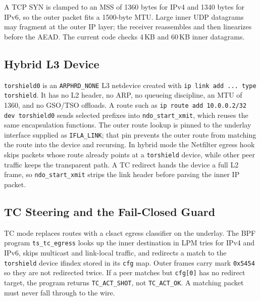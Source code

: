 \documentclass[conference]{IEEEtran}
\newcommand{\code}[1]{\texttt{#1}}
\begin{document}
A TCP SYN is clamped to an MSS of 1360 bytes for IPv4 and 1340 bytes for IPv6, so the outer packet fits a 1500-byte MTU. Large inner UDP datagrams may fragment at the outer IP layer; the receiver reassembles and then linearizes before the AEAD. The current code checks 4\,KB and 60\,KB inner datagrams.

\subsection{Hybrid L3 Device}
\code{torshield0} is an \code{ARPHRD\_NONE} L3 netdevice created with \code{ip link add ... type torshield}. It has no L2 header, no ARP, no queueing discipline, an MTU of 1360, and no GSO/TSO offloads. A route such as \code{ip route add 10.0.0.2/32 dev torshield0} sends selected prefixes into \code{ndo\_start\_xmit}, which reuses the same encapsulation functions. The outer route lookup is pinned to the underlay interface supplied as \code{IFLA\_LINK}; that pin prevents the outer route from matching the route into the device and recursing. In hybrid mode the Netfilter egress hook skips packets whose route already points at a \code{torshield} device, while other peer traffic keeps the transparent path. A TC redirect hands the device a full L2 frame, so \code{ndo\_start\_xmit} strips the link header before parsing the inner IP packet.

\subsection{TC Steering and the Fail-Closed Guard}
\label{sec:tc}
TC mode replaces routes with a clsact egress classifier on the underlay. The BPF program \code{ts\_tc\_egress} looks up the inner destination in LPM tries for IPv4 and IPv6, skips multicast and link-local traffic, and redirects a match to the \code{torshield} device ifindex stored in its \code{cfg} map. Outer frames carry mark \code{0x5454} so they are not redirected twice. If a peer matches but \code{cfg[0]} has no redirect target, the program returns \code{TC\_ACT\_SHOT}, not \code{TC\_ACT\_OK}. A matching packet must never fall through to the wire.
\end{document}
